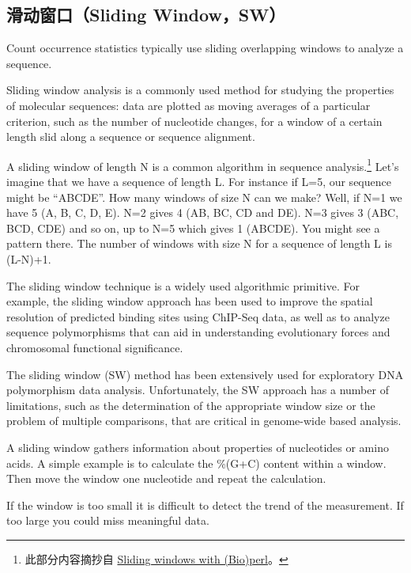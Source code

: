 \documentclass[11pt,a4paper,twoside]{book}
\begin{document}
\subsection{滑动窗口（Sliding Window，SW）}
Count occurrence statistics typically use sliding overlapping windows to analyze a sequence.

Sliding window analysis is a commonly used method for studying the properties of molecular sequences: data are plotted as moving averages of a particular criterion, such as the number of nucleotide changes, for a window of a certain length slid along a sequence or sequence alignment.

A sliding window of length N is a common algorithm in sequence analysis.\footnote{此部分内容摘抄自 \href{https://nsaunders.wordpress.com/2006/10/11/sliding-windows-with-bioperl/}{Sliding windows with (Bio)perl}。} Let’s imagine that we have a sequence of length L. For instance if L=5, our sequence might be “ABCDE”. How many windows of size N can we make? Well, if N=1 we have 5 (A, B, C, D, E). N=2 gives 4 (AB, BC, CD and DE). N=3 gives 3 (ABC, BCD, CDE) and so on, up to N=5 which gives 1 (ABCDE). You might see a pattern there. The number of windows with size N for a sequence of length L is (L-N)+1.

The sliding window technique is a widely used algorithmic primitive. For example, the sliding window approach has been used to improve the spatial resolution of predicted binding sites using ChIP-Seq data, as well as to analyze sequence polymorphisms that can aid in understanding evolutionary forces and chromosomal functional significance.

The sliding window (SW) method has been extensively used for exploratory DNA polymorphism data analysis. Unfortunately, the SW approach has a number of limitations, such as the determination of the appropriate window size or the problem of multiple comparisons, that are critical in genome-wide based analysis.

A sliding window gathers information about properties of nucleotides or amino acids. A simple example is to calculate the \%(G+C) content within a window.  Then move the window one nucleotide and repeat the calculation.

If the window is too small it is difficult to detect the trend of the measurement. If too large you could miss meaningful data.

\noindent
{}
\end{document}
